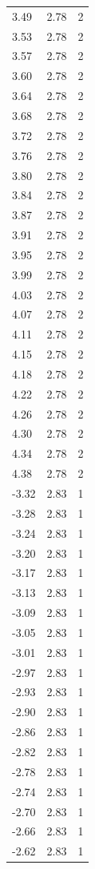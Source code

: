 \begin{longtable}{lrr}
  3.49 & 2.78 & 2 \\
  3.53 & 2.78 & 2 \\
  3.57 & 2.78 & 2 \\
  3.60 & 2.78 & 2 \\
  3.64 & 2.78 & 2 \\
  3.68 & 2.78 & 2 \\
  3.72 & 2.78 & 2 \\
  3.76 & 2.78 & 2 \\
  3.80 & 2.78 & 2 \\
  3.84 & 2.78 & 2 \\
  3.87 & 2.78 & 2 \\
  3.91 & 2.78 & 2 \\
  3.95 & 2.78 & 2 \\
  3.99 & 2.78 & 2 \\
  4.03 & 2.78 & 2 \\
  4.07 & 2.78 & 2 \\
  4.11 & 2.78 & 2 \\
  4.15 & 2.78 & 2 \\
  4.18 & 2.78 & 2 \\
  4.22 & 2.78 & 2 \\
  4.26 & 2.78 & 2 \\
  4.30 & 2.78 & 2 \\
  4.34 & 2.78 & 2 \\
  4.38 & 2.78 & 2 \\
  -3.32 & 2.83 & 1 \\
  -3.28 & 2.83 & 1 \\
  -3.24 & 2.83 & 1 \\
  -3.20 & 2.83 & 1 \\
  -3.17 & 2.83 & 1 \\
  -3.13 & 2.83 & 1 \\
  -3.09 & 2.83 & 1 \\
  -3.05 & 2.83 & 1 \\
  -3.01 & 2.83 & 1 \\
  -2.97 & 2.83 & 1 \\
  -2.93 & 2.83 & 1 \\
  -2.90 & 2.83 & 1 \\
  -2.86 & 2.83 & 1 \\
  -2.82 & 2.83 & 1 \\
  -2.78 & 2.83 & 1 \\
  -2.74 & 2.83 & 1 \\
  -2.70 & 2.83 & 1 \\
  -2.66 & 2.83 & 1 \\
  -2.62 & 2.83 & 1 \\

\end{longtable}
